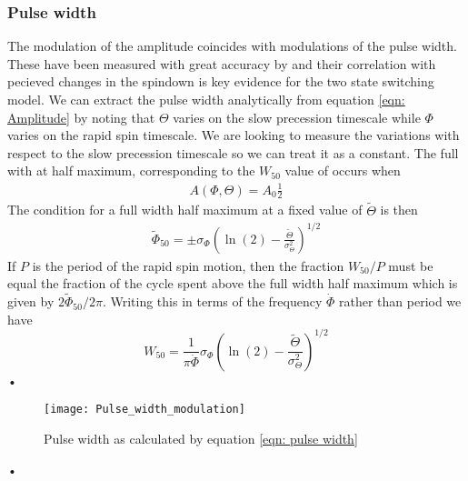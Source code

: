 \documentclass[/home/greg/Thesis/main/main.tex]{subfiles}
\begin{document}
\subsubsection{Pulse width}
The modulation of the amplitude coincides with modulations of the pulse width.
These have been measured with great accuracy by \citet{Lyne2010} and their
correlation with pecieved changes in the spindown is key evidence for the two
state switching model. We can extract the pulse width analytically from equation 
\eqref{eqn: Amplitude} by noting that $\Theta$ varies on the slow precession
timescale while $\Phi$ varies on the rapid spin timescale. We are looking to measure
the variations with respect to the slow precession timescale so we can treat it
as a constant. The full with at half maximum, corresponding to the $W_{50}$ value
of \citet{Lyne2010} occurs when
\begin{align}
A(\Phi, \Theta) = A_{0} \frac{1}{2} 
\end{align}
The condition for a full width half maximum at a fixed value of $\tilde{\Theta}$ 
is then
\begin{align}
\tilde{\Phi}_{50} = \pm\sigma_{\Phi}\left(\ln(2) - \frac{\tilde{\Theta}}{\sigma_{\Theta}^{2}}\right)^{1/2}
\end{align}
If $P$ is the period of the rapid spin motion, then the fraction $W_{50}/P$ must be equal
the fraction of the cycle spent above the full width half maximum which is 
given by $2\tilde{\Phi}_{50} / 2\pi$. Writing this in terms of the frequency $\dot{\Phi}$
rather than period we have
\begin{equation}
W_{50} = \frac{1}{\pi\dot\Phi}\sigma_{\Phi}\left(\ln(2) -  \frac{\tilde{\Theta}}{\sigma_{\Theta}^{2}}\right)^{1/2}
\label{eqn: pulse width}
\end{equation}•


\begin{figure}[ht]
\centering
\texttt{[image: Pulse\_width\_modulation]}
\caption{Pulse width as calculated by equation \eqref{eqn: pulse width} }
\label{fig: PulseWidthModulation}
\end{figure}•
\end{document}
